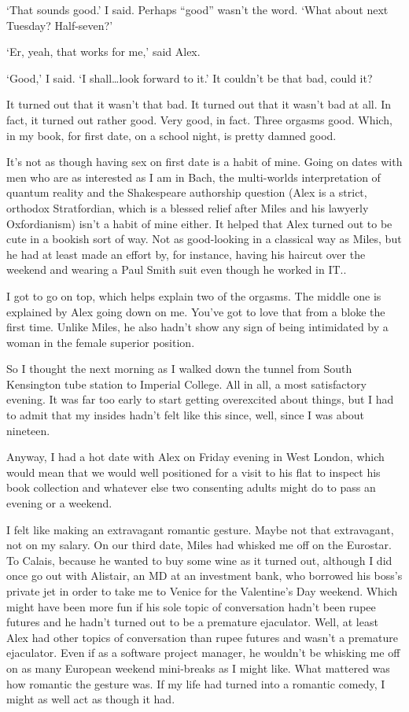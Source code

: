 `That sounds good.' I said. Perhaps ``good'' wasn't the word. `What
about next Tuesday? Half-seven?'

`Er, yeah, that works for me,' said Alex.

`Good,' I said. `I shall\dots look forward to it.' It couldn't be
that bad, could it?

It turned out that it wasn't that bad. It turned out that it wasn't
bad at all. In fact, it turned out rather good. Very good, in fact.
Three orgasms good. Which, in my book, for first date, on a school
night, is pretty damned good.

It's not as though having sex on first date is a habit of mine.
Going on dates with men who are as interested as I am in Bach, the
multi-worlds interpretation of quantum reality and the Shakespeare
authorship question (Alex is a strict, orthodox Stratfordian, which
is a blessed relief after Miles and his lawyerly Oxfordianism) isn't
a habit of mine either. It helped that Alex turned out to be cute in
a bookish sort of way. Not as good-looking in a classical way as
Miles, but he had at least made an effort by, for instance, having
his haircut over the weekend and wearing a Paul Smith suit even though he worked in IT..

I got to go on top, which helps explain two of the orgasms. The
middle one is explained by Alex going down on me. You've got to love
that from a bloke the first time. Unlike Miles, he also hadn't show
any sign of being intimidated by a woman in the female superior
position.

So I thought the next morning as I walked down the tunnel from South
Kensington tube station to Imperial College. All in all, a most
satisfactory evening. It was far too early to start getting
overexcited about things, but I had to admit that my insides hadn't
felt like this since, well, since I was about nineteen.

Anyway, I had a hot date with Alex on Friday evening in West London,
which would mean that we would well positioned for a visit to his
flat to inspect his book collection and whatever else two consenting
adults might do to pass an evening or a weekend.

I felt like making an extravagant romantic gesture. Maybe not that
extravagant, not on my salary. On our third date, Miles had whisked
me off on the Eurostar. To Calais, because he wanted to buy some
wine as it turned out, although I did once go out with Alistair, an
MD at an investment bank, who borrowed his boss's private jet in
order to take me to Venice for the Valentine's Day weekend. Which
might have been more fun if his sole topic of conversation hadn't
been rupee futures and he hadn't turned out to be a premature
ejaculator. Well, at least Alex had other topics of conversation
than rupee futures and wasn't a premature ejaculator. Even if as a
software project manager, he wouldn't be whisking me off on as many
European weekend mini-breaks as I might like. What mattered was how
romantic the gesture was. If my life had turned into a romantic
comedy, I might as well act as though it had.

